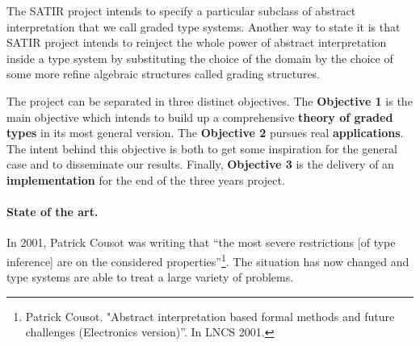 \documentclass{article}[11pt]
\begin{document}
The SATIR project intends to specify a particular subclass of abstract interpretation that we call graded type systems. Another way to state it is that SATIR project intends to reinject the whole power of abstract interpretation inside a type system by substituting the choice of the domain by the choice of some more refine algebraic structures called grading structures.

The project can be separated in three distinct objectives. The {\bf Objective 1} is the main objective which intends to build up a comprehensive {\bf theory of graded types} in its most general version. The {\bf Objective 2} pursues real {\bf applications}. %
The intent behind this objective is both to get some inspiration for the general case and to disseminate our results. Finally, {\bf Objective 3} is the delivery of an {\bf implementation} for the end of the three years project.


\paragraph{State of the art.}


In 2001, Patrick Cousot was writing that ``the most severe restrictions [of type inference] are on the considered properties''\footnote{Patrick Cousot. "Abstract interpretation based formal methods and future challenges (Electronics version)''. In LNCS 2001.}. The situation has now changed and type systems are able to treat a large variety of problems.
\end{document}
